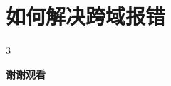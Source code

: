 \documentclass[aspectratio=169,xcolor=dvipsnames,UTF8]{beamer}
\begin{document}
\section{如何解决跨域报错}
\begin{frame}
 3
\end{frame}


\begin{frame}
    \Huge{\centerline{\textbf{谢谢观看}}}
\end{frame}

\end{document}
